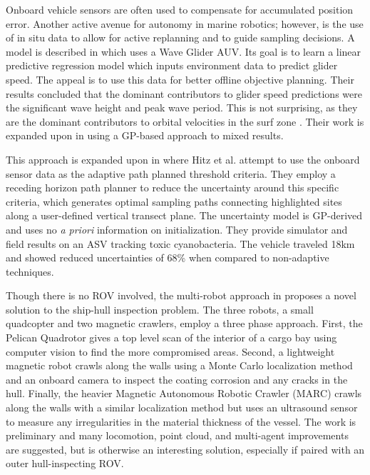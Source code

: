 \documentclass[double,12pt]{beavtex}
\begin{document}
Onboard vehicle sensors are often used to compensate for accumulated position error. Another active avenue for autonomy in marine robotics; however, is the use of in situ data to allow for active replanning and to guide sampling decisions. A model is described in \cite{smithmeas} which uses a Wave Glider AUV. Its goal is to learn a linear predictive regression model which inputs environment data to predict glider speed. The appeal is to use this data for better offline objective planning. Their results concluded that the dominant contributors to glider speed predictions were the significant wave height and peak wave period. This is not surprising, as they are the dominant contributors to orbital velocities in the surf zone \cite{D&D}. Their work is expanded upon in \cite{ngo} using a GP-based approach to mixed results.

This approach is expanded upon in \cite{hitz} where Hitz et al. attempt to use the onboard sensor data as the adaptive path planned threshold criteria. They employ a receding horizon path planner to reduce the uncertainty around this specific criteria, which generates optimal sampling paths connecting highlighted sites along a user-defined vertical transect plane. The uncertainty model is GP-derived and uses no \textit{a priori} information on initialization. They provide simulator and field results on an ASV tracking toxic cyanobacteria. The vehicle traveled 18km and showed reduced uncertainties of 68\% when compared to non-adaptive techniques.

Though there is no ROV involved, the multi-robot approach in \cite{eich} proposes a novel solution to the ship-hull inspection problem. The three robots, a small quadcopter and two magnetic crawlers, employ a three phase approach. First, the Pelican Quadrotor gives a top level scan of the interior of a cargo bay using computer vision to find the more compromised areas. Second, a lightweight magnetic robot crawls along the walls using a Monte Carlo localization method and an onboard camera to inspect the coating corrosion and any cracks in the hull. Finally, the heavier Magnetic Autonomous Robotic Crawler (MARC) crawls along the walls with a similar localization method but uses an ultrasound sensor to measure any irregularities in the material thickness of the vessel. The work is preliminary and many locomotion, point cloud, and multi-agent improvements are suggested, but is otherwise an interesting solution, especially if paired with an outer hull-inspecting ROV.
\end{document}
